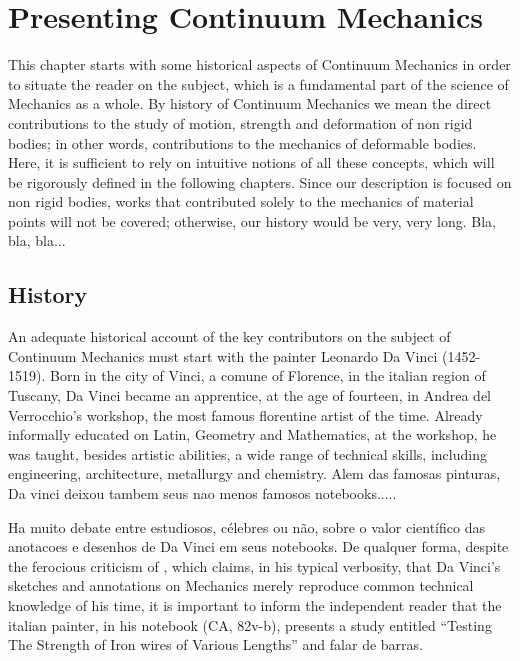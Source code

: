 \chapter{Presenting Continuum Mechanics}\label{ch:Collect}


This chapter starts with some historical aspects of Continuum Mechanics in order to situate the reader on the subject, which is a fundamental part of the science of Mechanics as a whole. By history of Continuum Mechanics we mean the direct contributions to the study of motion, strength and deformation of non rigid bodies; in other words, contributions to the mechanics of deformable bodies. Here, it is sufficient to rely on intuitive notions of all these concepts, which will be rigorously defined in the following chapters. Since our description is focused on non rigid bodies, works that contributed solely to the mechanics of material points will not be covered; otherwise, our history would be very, very long. Bla, bla, bla... 


\section{History}


An adequate historical account of the key contributors on the subject of Continuum Mechanics must start with the painter Leonardo Da Vinci (1452-1519). Born in the city of Vinci, a comune of Florence, in the italian region of Tuscany, Da Vinci became an apprentice, at the age of fourteen, in Andrea del Verrocchio's workshop, the most famous florentine artist of the time. Already informally educated on Latin, Geometry and Mathematics, at the workshop, he was taught, besides artistic abilities, a wide range of technical skills, including engineering, architecture, metallurgy and chemistry. Alem das famosas pinturas, Da vinci deixou tambem seus nao menos famosos notebooks.....

Ha muito debate entre estudiosos, célebres ou não, sobre o valor científico das anotacoes e desenhos de Da Vinci em seus notebooks. De qualquer forma, despite the ferocious criticism of \cite{truesdell_1968}, which claims, in his typical verbosity, that Da Vinci's sketches and annotations on Mechanics merely reproduce common technical knowledge of his time, it is important to inform the independent reader that the italian painter, in his notebook (CA, 82v-b), presents a study entitled ``Testing The Strength of Iron wires of Various Lengths'' and falar de barras.     